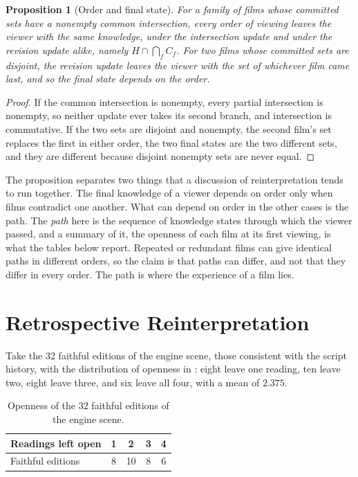 \documentclass[11pt,twoside,openright]{book}
\theoremstyle{plain}
\newtheorem{proposition}[theorem]{Proposition}
\theoremstyle{definition}
\theoremstyle{remark}
\begin{document}
\begin{proposition}[Order and final state]\label{prop:order14}
For a family of films whose committed sets have a nonempty common intersection, every order of viewing leaves the viewer with the same knowledge, under the intersection update and under the revision update alike, namely $H\cap\bigcap_fC_f$. For two films whose committed sets are disjoint, the revision update leaves the viewer with the set of whichever film came last, and so the final state depends on the order.
\end{proposition}

\begin{proof}
If the common intersection is nonempty, every partial intersection is nonempty, so neither update ever takes its second branch, and intersection is commutative. If the two sets are disjoint and nonempty, the second film's set replaces the first in either order, the two final states are the two different sets, and they are different because disjoint nonempty sets are never equal.
\end{proof}

The proposition separates two things that a discussion of reinterpretation tends to run together. The final knowledge of a viewer depends on order only when films contradict one another. What can depend on order in the other cases is the path. The \emph{path} here is the sequence of knowledge states through which the viewer passed, and a summary of it, the openness of each film at its first viewing, is what the tables below report. Repeated or redundant films can give identical paths in different orders, so the claim is that paths can differ, and not that they differ in every order. The path is where the experience of a film lies.

\section{Retrospective Reinterpretation}\label{sec:retro14}

Take the $32$ faithful editions of the engine scene, those consistent with the script history, with the distribution of openness in : eight leave one reading, ten leave two, eight leave three, and six leave all four, with a mean of $2.375$.

\begin{table}[ht]
\centering
\begin{tabular}{@{}lcccc@{}}
\toprule
Readings left open & 1 & 2 & 3 & 4\\
\midrule
Faithful editions & 8 & 10 & 8 & 6\\
\bottomrule
\end{tabular}
\caption{Openness of the $32$ faithful editions of the engine scene.}\label{tab:open14}
\end{table}
\end{document}
